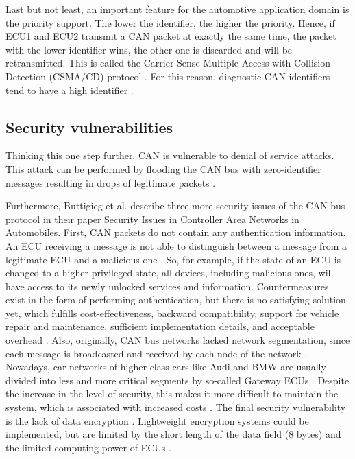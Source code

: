 Last but not least, an important feature for the automotive application domain is the priority support. The lower the identifier, the higher the priority. Hence, if ECU1 and ECU2 transmit a CAN packet at exactly the same time, the packet with the lower identifier wins, the other one is discarded and will be retransmitted. This is called the Carrier Sense Multiple Access with Collision Detection (CSMA/CD) protocol \cite{Sharma2016}. For this reason, diagnostic CAN identifiers tend to have a high identifier \cite{Herrewegen2018}.

\subsection{Security vulnerabilities}

Thinking this one step further, CAN is vulnerable to denial of service attacks. This attack can be performed by flooding the CAN bus with zero-identifier messages resulting in drops of legitimate packets \cite{Buttigieg2017}.

Furthermore, Buttigieg et al. \cite{Buttigieg2017} describe three more security issues of the CAN bus protocol in their paper {Security Issues in Controller Area Networks in Automobiles}.
First, CAN packets do not contain any authentication information. An ECU receiving a message is not able to distinguish between a message from a legitimate ECU and a malicious one \cite{Buttigieg2017}. So, for example, if the state of an ECU is changed to a higher privileged state, all devices, including malicious ones, will have access to its newly unlocked services and information. Countermeasures exist in the form of performing authentication, but there is no satisfying solution yet, which fulfills cost-effectiveness, backward compatibility, support for vehicle repair and maintenance, sufficient implementation details, and acceptable overhead \cite{Bozdal2020}.
Also, originally, CAN bus networks lacked network segmentation, since each message is broadcasted and received by each node of the network \cite{Buttigieg2017}. Nowadays, car networks of higher-class cars like Audi and BMW are usually divided into less and more critical segments by so-called Gateway ECUs \cite{Bozdal2020}. Despite the increase in the level of security, this makes it more difficult to maintain the system, which is associated with increased costs \cite{Bozdal2020}.
The final security vulnerability is the lack of data encryption \cite{Buttigieg2017}. Lightweight encryption systems could be implemented, but are limited by the short length of the data field (8 bytes) and the limited computing power of ECUs \cite{Bozdal2020}.

